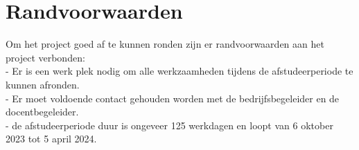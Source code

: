 \section{Randvoorwaarden}
Om het project goed af te kunnen ronden zijn er randvoorwaarden aan het project verbonden: \\
- Er is een werk plek nodig om alle werkzaamheden tijdens de afstudeerperiode te kunnen afronden.\\
- Er moet voldoende contact gehouden worden met de bedrijfsbegeleider en de docentbegeleider. \\ 
- de afstudeerperiode duur is ongeveer 125 werkdagen en loopt van 6 oktober 2023 tot 5 april 2024.
